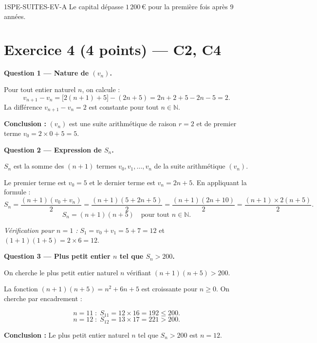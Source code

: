 \begin{corrige}{1SPE-SUITES-EV-A}
Le capital dépasse $1\,200$\,€ pour la première fois après $\boxed{9}$ années. \checkmark

\section*{Exercice 4 \hfill (4 points) — C2, C4}


\bigskip
\textbf{Question 1 — Nature de $(v_n)$.}


Pour tout entier naturel $n$, on calcule :
\[
  v_{n+1} - v_n = \bigl[2(n+1)+5\bigr] - (2n+5) = 2n + 2 + 5 - 2n - 5 = 2.
\]
La différence $v_{n+1} - v_n = 2$ est constante pour tout $n \in \mathbb{N}$.

\textbf{Conclusion :} $(v_n)$ est une suite arithmétique de raison $r = 2$ et de premier terme $v_0 = 2 \times 0 + 5 = 5$.

\medskip
\textbf{Question 2 — Expression de $S_n$.}


$S_n$ est la somme des $(n+1)$ termes $v_0, v_1, \ldots, v_n$ de la suite arithmétique $(v_n)$.

Le premier terme est $v_0 = 5$ et le dernier terme est $v_n = 2n + 5$. En appliquant la formule :
\[
  S_n = \frac{(n+1)(v_0 + v_n)}{2} = \frac{(n+1)(5 + 2n + 5)}{2} = \frac{(n+1)(2n+10)}{2} = \frac{(n+1) \times 2(n+5)}{2}.
\]
\[
  \boxed{S_n = (n+1)(n+5)} \quad \text{pour tout } n \in \mathbb{N}.
\]

\textit{Vérification pour $n = 1$ :} $S_1 = v_0 + v_1 = 5 + 7 = 12$ et $(1+1)(1+5) = 2 \times 6 = 12$. \checkmark

\medskip
\textbf{Question 3 — Plus petit entier $n$ tel que $S_n > 200$.}


On cherche le plus petit entier naturel $n$ vérifiant $(n+1)(n+5) > 200$.

La fonction $(n+1)(n+5) = n^2 + 6n + 5$ est croissante pour $n \geq 0$. On cherche par encadrement :

\[
  n = 11 \;:\; S_{11} = 12 \times 16 = 192 \leq 200.
\]
\[
  n = 12 \;:\; S_{12} = 13 \times 17 = 221 > 200.
\]

\textbf{Conclusion :} Le plus petit entier naturel $n$ tel que $S_n > 200$ est $\boxed{n = 12}$.

\end{corrige}
